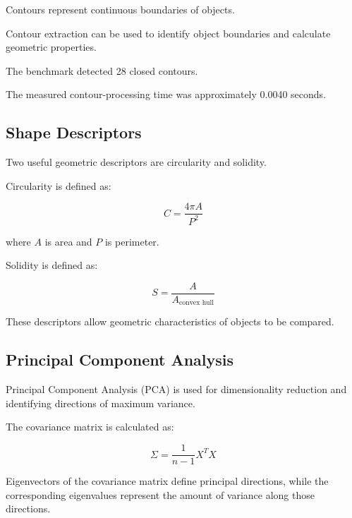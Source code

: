 \documentclass[11pt,a4paper]{article}
\begin{document}
Contours represent continuous boundaries of objects.

Contour extraction can be used to identify object boundaries and calculate geometric properties.

The benchmark detected 28 closed contours.

The measured contour-processing time was approximately 0.0040 seconds.


\subsection{Shape Descriptors}

Two useful geometric descriptors are circularity and solidity.

Circularity is defined as:

\begin{equation}
C=
\frac{4\pi A}{P^2}
\end{equation}

where $A$ is area and $P$ is perimeter.

Solidity is defined as:

\begin{equation}
S=
\frac{A}{A_{\text{convex hull}}}
\end{equation}

These descriptors allow geometric characteristics of objects to be compared.


\subsection{Principal Component Analysis}

Principal Component Analysis (PCA) is used for dimensionality reduction and identifying directions of maximum variance.

The covariance matrix is calculated as:

\begin{equation}
\Sigma=
\frac{1}{n-1}
X^TX
\end{equation}

Eigenvectors of the covariance matrix define principal directions, while the corresponding eigenvalues represent the amount of variance along those directions.
\end{document}
